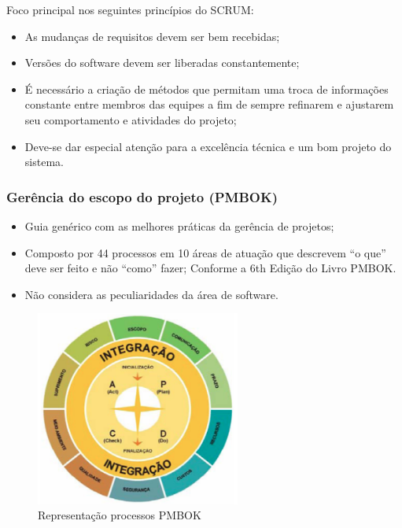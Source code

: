 Foco principal nos seguintes princípios do SCRUM:

\begin{itemize}
\item As mudanças de requisitos devem ser bem recebidas;
 
\item Versões do software devem ser liberadas constantemente;
 
\item É necessário a criação de métodos que permitam uma troca de informações constante entre membros das equipes a fim de sempre refinarem e ajustarem seu comportamento e atividades do projeto;
 
\item Deve-se dar especial atenção para a excelência técnica e um bom projeto do sistema.
\end{itemize}

\subsubsection{Gerência do escopo do projeto (PMBOK)}

\begin{itemize}
 \item Guia genérico com as melhores práticas da gerência de projetos;
 
\item Composto por 44 processos em 10 áreas de atuação que descrevem “o que” deve ser feito e não “como” fazer;   Conforme a 6th Edição do Livro PMBOK.
 
\item Não considera as peculiaridades da área de software.

\end{itemize}

\begin{figure}[H]
  \centering
  \includegraphics[width=0.6\textwidth]{softwareengineer/images/pmbok-representation} 
  \caption{Representação processos PMBOK}
  \label{fig:pmbok-representation} 
\end{figure}


